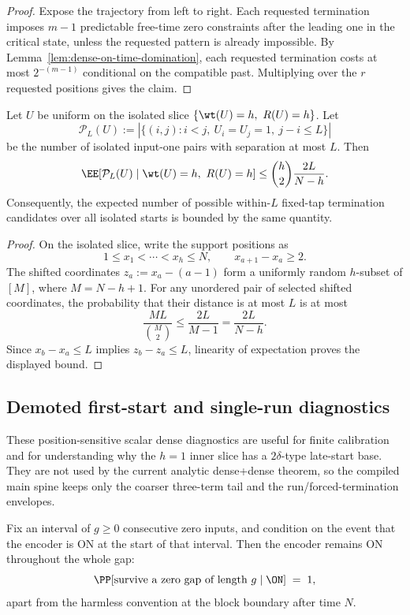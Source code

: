 \begin{proof}
Expose the trajectory from left to right. Each requested termination imposes \(m-1\) predictable free-time zero
constraints after the leading one in the critical state, unless the requested pattern is already impossible. By
Lemma~\ref{lem:dense-on-time-domination}, each requested termination costs at most \(2^{-(m-1)}\) conditional on the
compatible past. Multiplying over the \(r\) requested positions gives the claim.
\end{proof}

\begin{corollary}
\label{cor:fixedtap-isolated-pair-candidates}
Let \(U\) be uniform on the isolated slice \(\{\wt(U)=h,\ R(U)=h\}\). Let
\[
\mathcal{P}_L(U)
:=
|\{(i,j): i<j,\ U_i=U_j=1,\ j-i\le L\}|
\]
be the number of isolated input-one pairs with separation at most \(L\). Then
\[
\EE[\mathcal{P}_L(U)\mid \wt(U)=h,\ R(U)=h]
\le
\binom{h}{2}\frac{2L}{N-h}.
\]
Consequently, the expected number of possible within-\(L\) fixed-tap termination candidates over all isolated starts is
bounded by the same quantity.
\end{corollary}

\begin{proof}
On the isolated slice, write the support positions as
\[
1\le x_1<\cdots<x_h\le N,\qquad x_{a+1}-x_a\ge 2.
\]
The shifted coordinates \(z_a:=x_a-(a-1)\) form a uniformly random \(h\)-subset of \([M]\), where \(M=N-h+1\). For any
unordered pair of selected shifted coordinates, the probability that their distance is at most \(L\) is at most
\[
\frac{ML}{\binom{M}{2}}\le \frac{2L}{M-1}=\frac{2L}{N-h}.
\]
Since \(x_b-x_a\le L\) implies \(z_b-z_a\le L\), linearity of expectation proves the displayed bound.
\end{proof}

\subsection{Demoted first-start and single-run diagnostics}

These position-sensitive scalar dense diagnostics are useful for finite calibration and for understanding why the
\(h=1\) inner slice has a \(2\delta\)-type late-start base. They are not used by the current analytic dense+dense
theorem, so the compiled main spine keeps only the coarser three-term tail and the run/forced-termination envelopes.

\begin{corollary}
\label{cor:dense-gap-survival}
Fix an interval of \(g\ge0\) consecutive zero inputs, and condition on the event that the encoder is ON at the start of
that interval. Then the encoder remains ON throughout the whole gap:
\begin{equation}
\label{eq:dense-gap-survival}
\PP[\text{survive a zero gap of length }g \mid \ON]
\;=\;
1,
\end{equation}
apart from the harmless convention at the block boundary after time \(N\).
\end{corollary}

